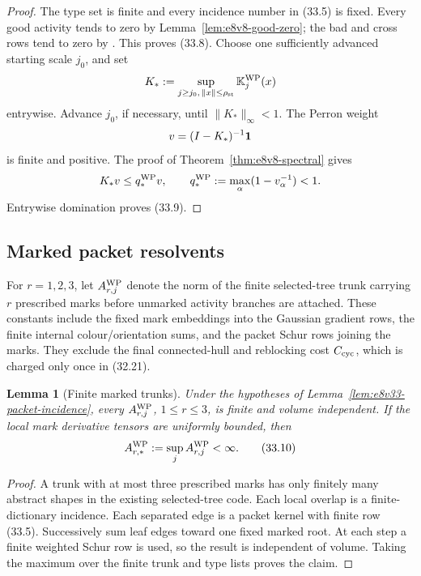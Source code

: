 \documentclass[11pt,oneside]{book}
\newtheorem{lemma}[theorem]{Lemma}
\theoremstyle{definition}
\theoremstyle{remark}
\begin{document}
\begin{proof}
The type set is finite and every incidence number in (33.5) is fixed.
Every good activity tends to zero by
Lemma~\ref{lem:e8v8-good-zero}; the bad and cross rows tend to zero
by .  This proves (33.8).
Choose one sufficiently advanced starting scale \(j_0\), and set
\[
 K_*:=\sup_{j\geq j_0,\,\|x\|\leq\rho_{\rm st}}
 {\mathbb K}^{\rm WP}_j(x)
\]
entrywise.  Advance \(j_0\), if necessary, until
\(\|K_*\|_\infty<1\).  The Perron weight
\[
                         v=(I-K_*)^{-1}{\bf1}
\]
is finite and positive.  The proof of
Theorem~\ref{thm:e8v8-spectral} gives
\[
 K_*v\leq q_*^{\rm WP}v,\qquad
 q_*^{\rm WP}:=\max_\alpha(1-v_\alpha^{-1})<1.
\]
Entrywise domination proves (33.9).
\end{proof}

\subsection{Marked packet resolvents}

For \(r=1,2,3\), let \(A_{r,j}^{\rm WP}\) denote the norm of the
finite selected-tree trunk carrying \(r\) prescribed marks before
unmarked activity branches are attached.  These constants include
the fixed mark embeddings into the Gaussian gradient rows, the
finite internal colour/orientation sums, and the packet Schur rows
joining the marks.  They exclude the final connected-hull and
reblocking cost \(C_{\rm cyc}\), which is charged only once in
(32.21).

\begin{lemma}[Finite marked trunks]
\label{lem:e8v33-marked-trunks}
Under the hypotheses of
Lemma~\ref{lem:e8v33-packet-incidence}, every
\(A_{r,j}^{\rm WP}\), \(1\leq r\leq3\), is finite and volume
independent.  If the local mark derivative tensors are uniformly
bounded, then
\[
                        A_{r,*}^{\rm WP}:=\sup_jA_{r,j}^{\rm WP}
                        <\infty.                                \tag{33.10}
\]
\end{lemma}

\begin{proof}
A trunk with at most three prescribed marks has only finitely many
abstract shapes in the existing selected-tree code.  Each local
overlap is a finite-dictionary incidence.  Each separated edge is a
packet kernel with finite row (33.5).  Successively sum leaf edges
toward one fixed marked root.  At each step a finite weighted Schur
row is used, so the result is independent of volume.  Taking the
maximum over the finite trunk and type lists proves the claim.
\end{proof}
\end{document}
